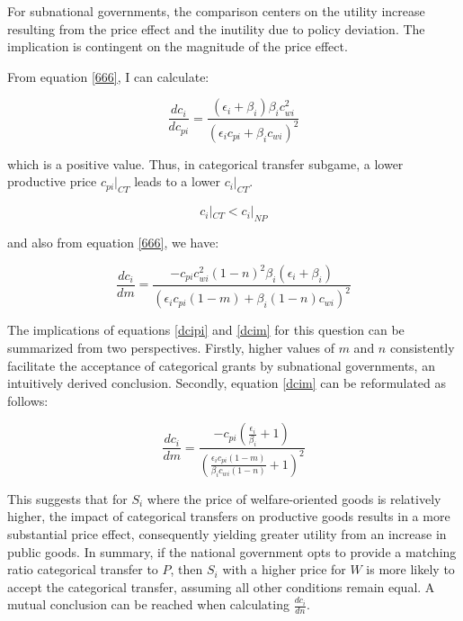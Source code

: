 \documentclass[man]{apa7}
\begin{document}

For subnational governments, the comparison centers on the utility increase resulting from the price effect and the inutility due to policy deviation. The implication is contingent on the magnitude of the price effect.%

From equation \ref{666}, I can calculate:

\begin{equation}
  \frac{dc_i}{dc_{pi}}=\frac{(\epsilon_i+\beta_i)\beta_i c_{wi}^2}{(\epsilon_ic_{pi}+\beta_i c_{wi})^2}\label{dcipi}
\end{equation}

which is a positive value. Thus, in categorical transfer subgame, a lower productive price $c_{pi}|_{CT}$ leads to a lower $c_i|_{CT}$.

\begin{equation}
  c_{i}|_{CT}<c_i|_{NP}\label{ctpnpp}
\end{equation}

and also from equation \ref{666}, we have:

\begin{equation}
  \frac{dc_i}{dm}=\frac{-c_{pi}c_{wi}^2(1-n)^2\beta_i(\epsilon_i+\beta_i)}{(\epsilon_i c_{pi} (1-m)+\beta_i(1-n) c_{wi})^2}\label{dcim}
\end{equation}

The implications of equations \ref{dcipi} and \ref{dcim} for this question can be summarized from two perspectives. Firstly, higher values of $m$ and $n$ consistently facilitate the acceptance of categorical grants by subnational governments, an intuitively derived conclusion. Secondly, equation \ref{dcim} can be reformulated as follows:

\begin{equation}
  \frac{d c_i}{d m}= \frac{-c_{pi}(\frac{\epsilon_i}{\beta_i}+1)}{(\frac{\epsilon_ic_{pi}(1-m)}{\beta_ic_{wi}(1-n)}+1)^2}
\end{equation}

This suggests that for $S_i$ where the price of welfare-oriented goods is relatively higher, the impact of categorical transfers on productive goods results in a more substantial price effect, consequently yielding greater utility from an increase in public goods. In summary, if the national government opts to provide a matching ratio categorical transfer to $P$, then $S_i$ with a higher price for $W$ is more likely to accept the categorical transfer, assuming all other conditions remain equal. A mutual conclusion can be reached when calculating $\frac{dc_i}{dn}$.
\end{document}
